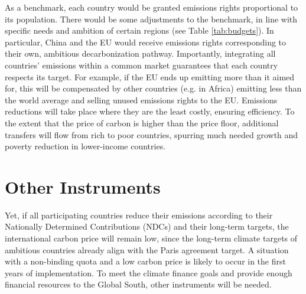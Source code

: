 \documentclass[12pt,english]{article}
\begin{document}
\begin{bibunit}
As a benchmark, each country would be granted emissions rights proportional to its population. There would be some adjustments to the benchmark, in line with specific needs and ambition of certain regions (see Table \ref{tab:budgets}). In particular, China and the EU would receive emissions rights corresponding to their own, ambitious decarbonization pathway. Importantly, integrating all countries' emissions within a common market guarantees that each country respects its target. For example, if the EU ends up emitting more than it aimed for, this will be compensated by other countries (e.g. in Africa) emitting less than the world average and selling unused emissions rights to the EU. Emissions reductions will take place where they are the least costly, ensuring efficiency. To the extent that the price of carbon is higher than the price floor, additional transfers will flow from rich to poor countries, spurring much needed growth and poverty reduction in lower-income countries. 

\begin{table}[h]
  \caption{Carbon budget over 2030-2080 (in GtCO$_\text{2}$): budgets proposed and equal per capita budgets.\label{tab:budgets}} 
\end{table}

\section{Other Instruments}
Yet, if all participating countries reduce their emissions according to their Nationally Determined Contributions (NDCs) and their long-term targets, the international carbon price will remain low, since the long-term climate targets of ambitious countries already align with the Paris agreement target. A situation with a non-binding quota and a low carbon price is likely to occur in the first years of implementation. To meet the climate finance goals and provide enough financial resources to the Global South, other instruments will be needed. 


\end{bibunit}
\end{document}
